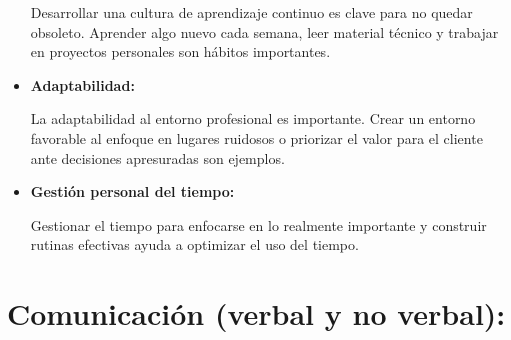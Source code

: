 \documentclass[a4paper,12pt,twoside]{article}
\begin{document}
\begin{itemize}
    Desarrollar una cultura de aprendizaje continuo es clave para no quedar obsoleto. Aprender 
    algo nuevo cada semana, leer material técnico y trabajar en proyectos personales son hábitos 
    importantes.

    \item \textbf{Adaptabilidad:} 
    
    La adaptabilidad al entorno profesional es importante. Crear un 
    entorno favorable al enfoque en lugares ruidosos o priorizar el valor para el cliente ante 
    decisiones apresuradas son ejemplos.
    
    \item \textbf{Gestión personal del tiempo:} 
    
    Gestionar el tiempo para enfocarse en lo realmente importante y construir rutinas efectivas 
    ayuda a optimizar el uso del tiempo.
\end{itemize}

\section{Comunicación (verbal y no verbal):}
\end{document}
